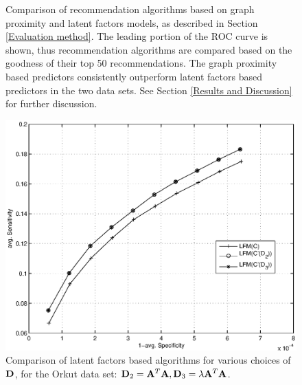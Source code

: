 \begin{figure}[ht]
\begin{center}
  \end{center}
  \caption{Comparison of recommendation algorithms based on graph proximity and latent factors models, as described in Section \ref{Evaluation method}. The leading portion of the ROC curve is shown, thus recommendation algorithms are compared based on the goodness of their top 50 recommendations. The graph proximity based predictors consistently outperform latent factors based predictors in the two data sets. See Section \ref{Results and Discussion} for further discussion.}
  \label{fig:summaryResults}
\end{figure}

\begin{figure}[ht]
  \begin{center}
    \includegraphics[scale=0.66]{summarySVDOrkut.eps}
  \end{center}
  \caption{Comparison of latent factors based algorithms for various choices of $\mathbf{D}$, for the Orkut data set: $\mathbf{D}_{2} = \mathbf{A}^{T}\mathbf{A}, \mathbf{D}_{3} = \lambda \mathbf{A}^{T}\mathbf{A}$.}
  \label{fig:summarySVD}
\end{figure}


